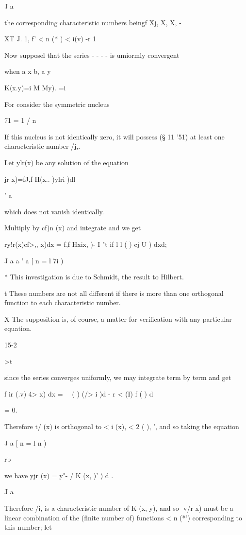 {J a

the corresponding characteristic numbers beingf Xj, X, X, -

XT J. 1, f' < n (* ) < i(v)  -r 1

Now supposel that the series - - - - is umiormly convergent

when a x b, a y %

K(x.y)=i M My). =i

For consider the symmetric nucleus

71 = 1 / n

If this nucleus is not identically zero, it will possess (§ 11 '51) at
least one characteristic number /j,.

Let ylr(x) be any solution of the equation

 jr x)=fJ,f H(x.. )ylri )dl

' a

which does not vanish identically.

Multiply by cf)n (x) and integrate and we get

ry!r(x)cf>,, x)dx = f,f Hxix, )- I "t if l l ( ) cj U ) dxd;

J a a ' a [ n = l 7i )

* This investigation is due to Schmidt, the result to Hilbert.

t These numbers are not all different if there is more than one
orthogonal function to each characteristic number.

X The supposition is, of course, a matter for verification with any
particular equation.

15-2

>t\

%
%

since the series converges uniformly, we may integrate term by term
and get

f ir (.v) 4> x) dx = \ \ ( ) (/> i )d - r < (I) f ( ) d

= 0.

Therefore t/ (x) is orthogonal to < i (x), < 2 ( ),  ', and so
taking the equation

J a [ n = l n )

rb

we have yjr (x) = y"- / K (x, )' ) d .

J a

Therefore /i, is a characteristic number of K (x, y), and so -v/r x)
must be a linear combination of the (finite number of) functions < n
(*') corresponding to this number; let

}
